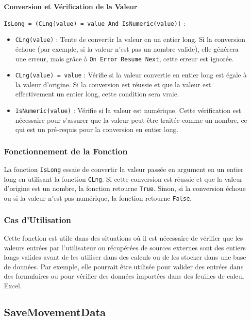 \documentclass[a4paper, oneside, 12pt, final]{extreport}
\begin{document}
\textbf{Conversion et Vérification de la Valeur}

\texttt{IsLong = (CLng(value) = value And IsNumeric(value))} :

\begin{itemize}
    \item \texttt{CLng(value)} : Tente de convertir la valeur en un entier long. Si la conversion échoue (par exemple, si la valeur n'est pas un nombre valide), elle générera une erreur, mais grâce à \texttt{On Error Resume Next}, cette erreur est ignorée.
    \item \texttt{CLng(value) = value} : Vérifie si la valeur convertie en entier long est égale à la valeur d'origine. Si la conversion est réussie et que la valeur est effectivement un entier long, cette condition sera vraie.
    \item \texttt{IsNumeric(value)} : Vérifie si la valeur est numérique. Cette vérification est nécessaire pour s'assurer que la valeur peut être traitée comme un nombre, ce qui est un pré-requis pour la conversion en entier long.
\end{itemize}

\subsubsection{Fonctionnement de la Fonction}

La fonction \texttt{IsLong} essaie de convertir la valeur passée en argument en un entier long en utilisant la fonction \texttt{CLng}. Si cette conversion est réussie et que la valeur d'origine est un nombre, la fonction retourne \texttt{True}. Sinon, si la conversion échoue ou si la valeur n'est pas numérique, la fonction retourne \texttt{False}.

\subsubsection{Cas d'Utilisation}

Cette fonction est utile dans des situations où il est nécessaire de vérifier que les valeurs entrées par l'utilisateur ou récupérées de sources externes sont des entiers longs valides avant de les utiliser dans des calculs ou de les stocker dans une base de données. Par exemple, elle pourrait être utilisée pour valider des entrées dans des formulaires ou pour vérifier des données importées dans des feuilles de calcul Excel.
\subsection{SaveMovementData}
\end{document}
